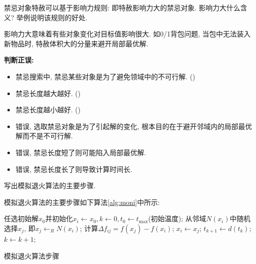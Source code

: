 \documentclass{article}
\begin{document}
\begin{homeworkProblem}
    禁忌对象特赦可以基于影响力规则: 即特赦影响力大的禁忌对象. 影响力大什么含义? 举例说明该规则的好处.

    \solution 影响力大意味着有些对象变化对目标值影响很大. 如0/1背包问题, 当包中无法装入新物品时, 特赦体积大的分量来避开局部最优解.
\end{homeworkProblem}



\begin{homeworkProblem}
    \textbf{判断正误:}
    \begin{itemize}
        \item 禁忌搜索中, 禁忌某些对象是为了避免领域中的不可行解. (\quad )
        \item 禁忌长度越大越好. (\quad )
        \item 禁忌长度越小越好. (\quad )
    \end{itemize}
    \solution 
    \begin{itemize}
        \item 错误, 选取禁忌对象是为了引起解的变化, 根本目的在于避开邻域内的局部最优解而不是不可行解.
        \item 错误, 禁忌长度短了则可能陷入局部最优解.
        \item 错误, 禁忌长度长了则导致计算时间长.
    \end{itemize}
\end{homeworkProblem}

\begin{homeworkProblem}
    写出模拟退火算法的主要步骤.

    \solution 模拟退火算法的主要步骤如下算法\ref{alg:moni}中所示:
    \begin{algorithm}[H]
		\begin{algorithmic}[1]
        \State 任选初始解$x_0$并初始化$x_i\gets x_0,k\gets 0, t_0\gets t_{\text{max}}$(初始温度);
            \State 从邻域$N(x_i)$中随机选择$x_j$, 即$x_j\gets _RN(x_i)$;
            \State 计算$\Delta f_{ij}=f(x_j)-f(x_i)$;
                \State $x_i\gets x_j$;
            \EndIf
            \State $t_{k+1}\gets d(t_k)$;
            \State $ k\gets k+1$;
        \EndWhile
		\end{algorithmic}
		\caption{模拟退火算法步骤}
		\label{alg:moni}
	\end{algorithm}
\end{homeworkProblem}
\end{document}
